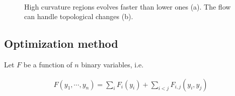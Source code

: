 \documentclass[runningheads]{llncs}
\begin{document}
\begin{figure}[!ht]
\center
{}\\%
\label{fig:mx-speed-variation-hole-filling}
\caption{High curvature regions evolves faster than lower ones (a). The flow can handle topological changes (b). }
\end{figure}


\subsection{Optimization method}

Let $F$ be a function of $n$ binary variables, i.e.

\begin{align*}
F(y_1,\cdots, y_n) = \sum_{i}{F_i(y_i)} + \sum_{i < j}{F_{i,j}(y_i,y_j)}
\end{align*}
\end{document}
